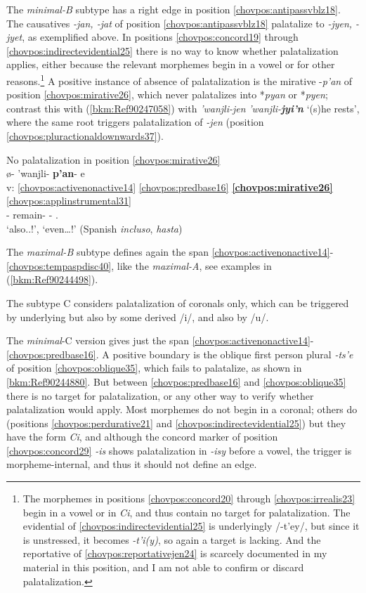 \documentclass[output=paper]{langscibook}
\begin{document}
The \textit{minimal-B} subtype has a right edge in position \ref{chovpos:antipassvblz18}. The causatives \textit{-jan, -jat} of position \ref{chovpos:antipassvblz18} palatalize to \textit{-jyen, -jyet}, as exemplified above. In positions \ref{chovpos:concord19} through \ref{chovpos:indirectevidential25} there is no way to know whether palatalization applies, either because the relevant morphemes begin in a vowel or for other reasons.\footnote{The morphemes in positions \ref{chovpos:concord20} through \ref{chovpos:irrealis23} begin in a vowel or in \textit{Ci}, and thus contain no target for palatalization. The evidential of \ref{chovpos:indirectevidential25} is underlyingly /-t'ey/, but since it is unstressed, it becomes \textit{-t'i(y)}, so again a target is lacking. And the reportative of \ref{chovpos:reportativejen24} is scarcely documented in my material in this position, and I am not able to confirm or discard palatalization.} A positive instance of absence of palatalization is the mirative -\textit{p'an} of position \ref{chovpos:mirative26}, which never palatalizes into *\textit{pyan} or *\textit{pyen}; contrast this with (\ref{bkm:Ref90247058}) with \textit{'wanjli-jen} \MVRightarrow{} \textit{'wanjli-}\textbf{\textit{jyi'n}} `(s)he rests', where the same root triggers palatalization of \textit{-jen} (position \ref{chovpos:pluractionaldownwards37}).

\ea\label{bkm:Ref90247058}No palatalization in position \ref{chovpos:mirative26} \\ 
\glll {} ø{}- 'wanjli- \textbf{p'an}{}- e\\ 
    v: \ref{chovpos:activenonactive14} \ref{chovpos:predbase16} \textbf{\ref{chovpos:mirative26}} \ref{chovpos:applinstrumental31}\\ 
    {} \Third{}- remain- \textbf{\Mir{}}- \Ap.\Ins{}\\ 
\glt `also..!', `even…!' (Spanish \textit{incluso}, \textit{hasta})
\z 

The \textit{maximal-B} subtype defines again the span \ref{chovpos:activenonactive14}{}-\ref{chovpos:tempaspdisc40}, like the \textit{maximal-A}, see examples in (\ref{bkm:Ref90244498}). 

The subtype C considers palatalization of coronals only, which can be triggered by underlying but also by some derived /i/, and also by /u/. 

The \textit{minimal}{}-C version gives just the span \ref{chovpos:activenonactive14}{}-\ref{chovpos:predbase16}. A positive boundary is the oblique first person plural \textit{{}-ts'e} of position \ref{chovpos:oblique35}, which fails to palatalize, as shown in \ref{bkm:Ref90244880}. But between \ref{chovpos:predbase16} and \ref{chovpos:oblique35} there is no target for palatalization, or any other way to verify whether palatalization would apply. Most morphemes do not begin in a coronal; others do (positions \ref{chovpos:perdurative21} and \ref{chovpos:indirectevidential25}) but they have the form \textit{Ci}, and although the concord marker of position \ref{chovpos:concord29} \textit{-is} shows palatalization in \textit{-isy} before a vowel, the trigger is morpheme-internal, and thus it should not define an edge. 
\end{document}
